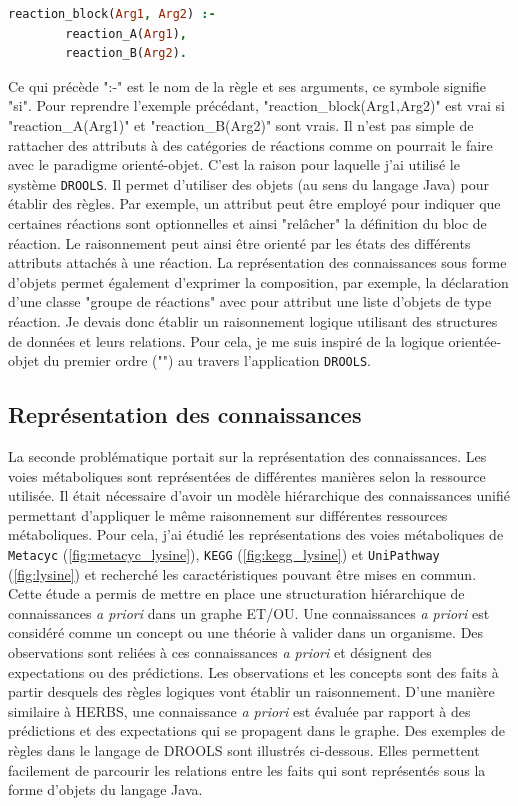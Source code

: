 \begin{refsegment}
\begin{lstlisting}[basicstyle=\small\normalfont\ttfamily,language=Prolog]
    reaction_block(Arg1, Arg2) :-
        reaction_A(Arg1),
        reaction_B(Arg2).
\end{lstlisting}

Ce qui précède  ":-" est le nom de la règle et ses arguments, ce symbole signifie "si". Pour reprendre l'exemple précédant, "reaction\_block(Arg1,Arg2)" est vrai si "reaction\_A(Arg1)" et "reaction\_B(Arg2)" sont vrais. Il n'est pas simple de rattacher des attributs à des catégories de réactions comme on pourrait le faire avec le paradigme orienté-objet. C'est la raison pour laquelle j'ai utilisé le système \texttt{DROOLS}. Il permet d'utiliser des objets (au sens du langage Java) pour établir des règles. Par exemple, un attribut peut être employé pour indiquer que certaines réactions sont optionnelles et ainsi "relâcher" la définition du bloc de réaction. Le raisonnement peut ainsi être orienté par les états des différents attributs attachés à une réaction. La représentation des connaissances sous forme d'objets permet également d'exprimer la composition, par exemple, la déclaration d'une classe "groupe de réactions" avec pour attribut une liste d'objets de type réaction. Je devais donc établir un raisonnement logique utilisant des structures de données et leurs relations. Pour cela, je me suis inspiré de la logique orientée-objet du premier ordre ("") \cite{amir1999object} au travers l'application \texttt{DROOLS}.

\subsection{Représentation des connaissances}

La seconde problématique portait sur la représentation des connaissances. Les voies métaboliques sont représentées de différentes manières selon la ressource utilisée. Il était nécessaire d'avoir un modèle hiérarchique des connaissances unifié permettant d'appliquer le même raisonnement sur différentes ressources métaboliques. Pour cela, j'ai étudié les représentations des voies métaboliques de \texttt{Metacyc} (\cref{fig:metacyc_lysine}), \texttt{KEGG} (\cref{fig:kegg_lysine}) et \texttt{UniPathway} (\cref{fig:lysine}) et recherché les caractéristiques pouvant être mises en commun. Cette étude a permis de mettre en place une structuration hiérarchique de connaissances \textit{a priori} dans un graphe ET/OU. Une connaissances \textit{a priori} est considéré comme un concept ou une théorie à valider dans un organisme. Des observations sont reliées à ces connaissances \textit{a priori} et désignent des expectations ou des prédictions. Les observations et les concepts sont des faits à partir desquels des règles logiques vont établir un raisonnement. D'une manière similaire à HERBS, une connaissance \textit{a priori} est évaluée par rapport à des prédictions et des expectations qui se propagent dans le graphe. Des exemples de règles dans le langage de DROOLS sont illustrés ci-dessous. Elles permettent facilement de parcourir les relations entre les faits qui sont représentés sous la forme d'objets du langage Java.


\end{refsegment}
